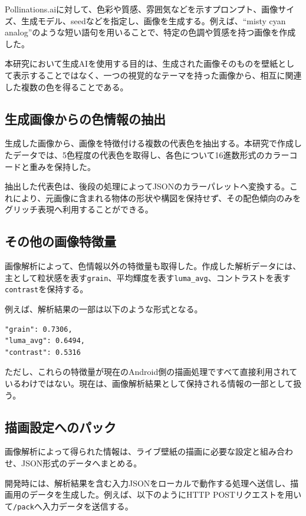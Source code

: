 Pollinations.aiに対して、色彩や質感、雰囲気などを示すプロンプト、画像サイズ、生成モデル、seedなどを指定し、画像を生成する。例えば、``misty cyan analog''のような短い語句を用いることで、特定の色調や質感を持つ画像を作成した。

本研究において生成AIを使用する目的は、生成された画像そのものを壁紙として表示することではなく、一つの視覚的なテーマを持った画像から、相互に関連した複数の色を得ることである。


\subsection{生成画像からの色情報の抽出}

生成した画像から、画像を特徴付ける複数の代表色を抽出する。本研究で作成したデータでは、5色程度の代表色を取得し、各色について16進数形式のカラーコードと重みを保持した。

抽出した代表色は、後段の処理によってJSONのカラーパレットへ変換する。これにより、元画像に含まれる物体の形状や構図を保持せず、その配色傾向のみをグリッチ表現へ利用することができる。


\subsection{その他の画像特徴量}

画像解析によって、色情報以外の特徴量も取得した。作成した解析データには、主として粒状感を表す\texttt{grain}、平均輝度を表す\texttt{luma\_avg}、コントラストを表す\texttt{contrast}を保持する。

例えば、解析結果の一部は以下のような形式となる。

\begin{verbatim}
"grain": 0.7306,
"luma_avg": 0.6494,
"contrast": 0.5316
\end{verbatim}

ただし、これらの特徴量が現在のAndroid側の描画処理ですべて直接利用されているわけではない。現在は、画像解析結果として保持される情報の一部として扱う。


\subsection{描画設定へのパック}

画像解析によって得られた情報は、ライブ壁紙の描画に必要な設定と組み合わせ、JSON形式のデータへまとめる。

開発時には、解析結果を含む入力JSONをローカルで動作する処理へ送信し、描画用のデータを生成した。例えば、以下のようにHTTP POSTリクエストを用いて\texttt{/pack}へ入力データを送信する。

